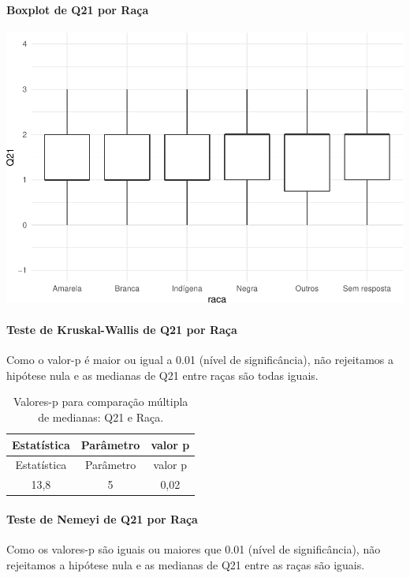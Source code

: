 \documentclass[]{article}
\let\oldparagraph\paragraph
\renewcommand{\paragraph}[1]{\oldparagraph{#1}\mbox{}}
\begin{document}
\hypertarget{boxplot-de-q21-por-rauxe7a}{%
\paragraph{Boxplot de Q21 por Raça}\label{boxplot-de-q21-por-rauxe7a}}

\begin{center}\includegraphics[width=0.75\linewidth]{relatorio_covid19_files/figure-latex/unnamed-chunk-460-1} \end{center}

\hypertarget{teste-de-kruskal-wallis-de-q21-por-rauxe7a}{%
\paragraph{Teste de Kruskal-Wallis de Q21 por Raça}\label{teste-de-kruskal-wallis-de-q21-por-rauxe7a}}

Como o valor-p é maior ou igual a 0.01 (nível de significância), não rejeitamos a hipótese nula e as medianas de Q21 entre raças são todas iguais.

\begin{longtable}[]{@{}ccc@{}}
\caption{\label{tab:unnamed-chunk-462}Valores-p para comparação múltipla de medianas: Q21 e Raça.}\tabularnewline
\toprule
Estatística & Parâmetro & valor p\tabularnewline
\midrule
\endfirsthead
\toprule
Estatística & Parâmetro & valor p\tabularnewline
\midrule
\endhead
13,8 & 5 & 0,02\tabularnewline
\bottomrule
\end{longtable}

\hypertarget{teste-de-nemeyi-de-q21-por-rauxe7a}{%
\paragraph{Teste de Nemeyi de Q21 por Raça}\label{teste-de-nemeyi-de-q21-por-rauxe7a}}

Como os valores-p são iguais ou maiores que 0.01 (nível de significância), não rejeitamos a hipótese nula e as medianas de Q21 entre as raças são iguais.
\end{document}

